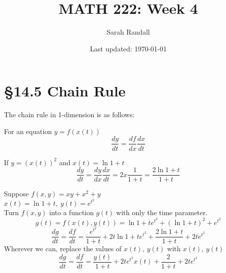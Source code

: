 \documentclass[12 pt]{article}
\author{Sarah Randall}
\date{Last updated: \today}
\title{MATH 222: Week 4}
\begin{document}
    \onehalfspacing
    \maketitle
    \tableofcontents
    \section{\S 14.5 Chain Rule}
        The chain rule in 1-dimension is as follows:

        For an equation $y=f(x(t))$
        $$\frac{dy}{dt}=\frac{df}{dx}\frac{dx}{dt}$$
        \begin{exmp*}
            If $y=(x(t))^2$ and $x(t)=\ln{1+t}$\\
            $$\frac{dy}{dt}=\frac{dy}{dx}\frac{dx}{dt}=2x\frac{1}{1+t}=\frac{2\ln{1+t}}{1+t}$$
        \end{exmp*}

        \begin{exmp*}
            Suppose $f(x,y)=xy+x^2+y$\\
            $x(t)=\ln{1+t},\ y(t)=e^{t^2}$\\
            Turn $f(x,y)$ into a function $g(t)$ with only the time parameter.
            $$g(t)=f(x(t),y(t))=\ln{1+t}e^{t^2}+(\ln{1+t})^2+e^{t^2}$$
            $$\frac{dg}{dt}=\frac{df}{dt}=\frac{e^{t^2}}{1+t}+2t\ln{1+t}e^{t^2}+\frac{2\ln{1+t}}{1+t}+2te^{t^2}$$
            Wherever we can, replace the values of $x(t),\ y(t)$ with $x(t),\ y(t)$
            $$\frac{dg}{dt}=\frac{df}{dt}=\frac{y(t)}{1+t}+2te^{t^2}x(t)+\frac{2}{1+t}+2te^{t^2}$$
        \end{exmp*}
\end{document}
